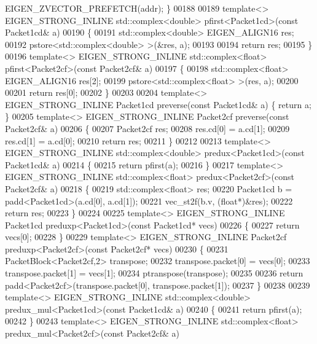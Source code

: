 \begin{DoxyCode}
      EIGEN\_ZVECTOR\_PREFETCH(addr); \}
00188 
00189 \textcolor{keyword}{template}<> EIGEN\_STRONG\_INLINE std::complex<double>  pfirst<Packet1cd>(\textcolor{keyword}{const} Packet1cd& a)
00190 \{
00191   std::complex<double> EIGEN\_ALIGN16 res;
00192   pstore<std::complex<double> >(&res, a);
00193 
00194   \textcolor{keywordflow}{return} res;
00195 \}
00196 \textcolor{keyword}{template}<> EIGEN\_STRONG\_INLINE std::complex<float>  pfirst<Packet2cf>(\textcolor{keyword}{const} Packet2cf& a)
00197 \{
00198   std::complex<float> EIGEN\_ALIGN16 res[2];
00199   pstore<std::complex<float> >(res, a);
00200 
00201   \textcolor{keywordflow}{return} res[0];
00202 \}
00203 
00204 \textcolor{keyword}{template}<> EIGEN\_STRONG\_INLINE Packet1cd preverse(\textcolor{keyword}{const} Packet1cd& a) \{ \textcolor{keywordflow}{return} a; \}
00205 \textcolor{keyword}{template}<> EIGEN\_STRONG\_INLINE Packet2cf preverse(\textcolor{keyword}{const} Packet2cf& a)
00206 \{
00207   Packet2cf res;
00208   res.cd[0] = a.cd[1];
00209   res.cd[1] = a.cd[0];
00210   \textcolor{keywordflow}{return} res;
00211 \}
00212 
00213 \textcolor{keyword}{template}<> EIGEN\_STRONG\_INLINE std::complex<double> predux<Packet1cd>(\textcolor{keyword}{const} Packet1cd& a)
00214 \{
00215   \textcolor{keywordflow}{return} pfirst(a);
00216 \}
00217 \textcolor{keyword}{template}<> EIGEN\_STRONG\_INLINE std::complex<float> predux<Packet2cf>(\textcolor{keyword}{const} Packet2cf& a)
00218 \{
00219   std::complex<float> res;
00220   Packet1cd b = padd<Packet1cd>(a.cd[0], a.cd[1]);
00221   vec\_st2f(b.v, (\textcolor{keywordtype}{float}*)&res);
00222   \textcolor{keywordflow}{return} res;
00223 \}
00224 
00225 \textcolor{keyword}{template}<> EIGEN\_STRONG\_INLINE Packet1cd preduxp<Packet1cd>(\textcolor{keyword}{const} Packet1cd* vecs)
00226 \{
00227   \textcolor{keywordflow}{return} vecs[0];
00228 \}
00229 \textcolor{keyword}{template}<> EIGEN\_STRONG\_INLINE Packet2cf preduxp<Packet2cf>(\textcolor{keyword}{const} Packet2cf* vecs)
00230 \{
00231   PacketBlock<Packet2cf,2> transpose;
00232   transpose.packet[0] = vecs[0];
00233   transpose.packet[1] = vecs[1];
00234   ptranspose(transpose);
00235 
00236   \textcolor{keywordflow}{return} padd<Packet2cf>(transpose.packet[0], transpose.packet[1]);
00237 \} 
00238 
00239 \textcolor{keyword}{template}<> EIGEN\_STRONG\_INLINE std::complex<double> predux\_mul<Packet1cd>(\textcolor{keyword}{const} Packet1cd& a)
00240 \{
00241   \textcolor{keywordflow}{return} pfirst(a);
00242 \}
00243 \textcolor{keyword}{template}<> EIGEN\_STRONG\_INLINE std::complex<float> predux\_mul<Packet2cf>(\textcolor{keyword}{const} Packet2cf& a)

\end{DoxyCode}
